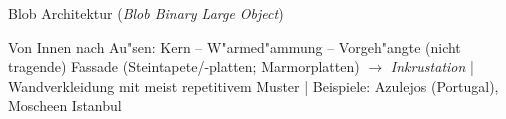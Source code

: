\documentclass[]{scrartcl}
\begin{document}
\begin{description}[leftmargin=!,labelwidth=\widthof{\bfseries Fachwerk}]
  \item[Blob] Blob Architektur (\emph{Blob Binary Large Object})
  \item[Fassade] Von Innen nach Au"sen: Kern -- W"armed"ammung -- Vorgeh"angte (nicht tragende) Fassade (Steintapete/-platten; Marmorplatten) $\rightarrow$ \emph{Inkrustation} | Wandverkleidung mit meist repetitivem Muster | Beispiele: Azulejos (Portugal), Moscheen Istanbul
\end{description}




\end{document}
